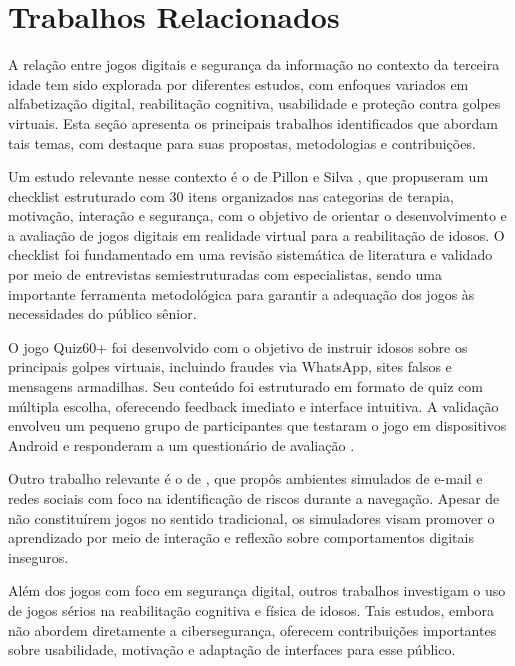 \chapter{Trabalhos Relacionados}\label{cap:trabalhos_relacionados}

A relação entre jogos digitais e segurança da informação no contexto da terceira idade tem sido explorada por diferentes estudos, com enfoques variados em alfabetização digital, reabilitação cognitiva, usabilidade e proteção contra golpes virtuais. Esta seção apresenta os principais trabalhos identificados que abordam tais temas, com destaque para suas propostas, metodologias e contribuições.

Um estudo relevante nesse contexto é o de Pillon e Silva \cite{pillon2022checklist}, que propuseram um checklist estruturado com 30 itens organizados nas categorias de terapia, motivação, interação e segurança, com o objetivo de orientar o desenvolvimento e a avaliação de jogos digitais em realidade virtual para a reabilitação de idosos. O checklist foi fundamentado em uma revisão sistemática de literatura e validado por meio de entrevistas semiestruturadas com especialistas, sendo uma importante ferramenta metodológica para garantir a adequação dos jogos às necessidades do público sênior.

O jogo Quiz60+ foi desenvolvido com o objetivo de instruir idosos sobre os principais golpes virtuais, incluindo fraudes via WhatsApp, sites falsos e mensagens armadilhas. Seu conteúdo foi estruturado em formato de quiz com múltipla escolha, oferecendo feedback imediato e interface intuitiva. A validação envolveu um pequeno grupo de participantes que testaram o jogo em dispositivos Android e responderam a um questionário de avaliação \cite{amorim2024quiz}.

Outro trabalho relevante é o de \cite{scarpioni2016desenvolvimento}, que propôs ambientes simulados de e-mail e redes sociais com foco na identificação de riscos durante a navegação. Apesar de não constituírem jogos no sentido tradicional, os simuladores visam promover o aprendizado por meio de interação e reflexão sobre comportamentos digitais inseguros.

Além dos jogos com foco em segurança digital, outros trabalhos investigam o uso de jogos sérios na reabilitação cognitiva e física de idosos. Tais estudos, embora não abordem diretamente a cibersegurança, oferecem contribuições importantes sobre usabilidade, motivação e adaptação de interfaces para esse público.

